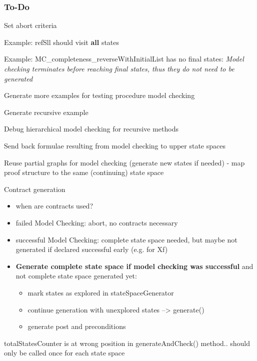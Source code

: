\documentclass[a4paper,12pt]{article}
\newcommand{\cmark}{\ding{51}}%
\newcommand{\xmark}{\ding{55}}%
\newcommand{\done}{\rlap{$\square$}{\raisebox{2pt}{\large\hspace{1pt}\cmark}}%
\hspace{-2.5pt}}
\newcommand{\wontfix}{\rlap{$\square$}{\large\hspace{1pt}\xmark}}
\begin{document}
\subsubsection{To-Do}
\begin{todolist}
	
	\item[\done] Set abort criteria	
	\item[\done] Example: refSll should visit \textbf{all} states
	\item[\done] Example: MC\_completeness\_reverseWithInitialList has no final states: \textit{Model checking terminates before reaching final states, thus they do not need to be generated}
	\item Generate more examples for testing procedure model checking 
	\item[\done] Generate recursive example
	\item Debug hierarchical model checking for recursive methods
	\item[\done] Send back formulae resulting from model checking to upper state spaces 
	\item Reuse partial graphs for model checking (generate new states if needed) - map proof structure to the same (continuing) state space
	\item Contract generation
	\begin{itemize}
		\item when are contracts used? 
		\item failed Model Checking: abort, no contracts necessary
		\item successful Model Checking: complete state space needed, but maybe not generated if declared successful early (e.g. for Xf)
		\item \textbf{ Generate complete state space if model checking was successful} and not complete state space generated yet: 
		\begin{itemize}
			\item mark states as explored in stateSpaceGenerator 
			\item continue generation with unexplored states --> generate() 
			\item generate post and preconditions
		\end{itemize} 
	\end{itemize}
	\item totalStatesCounter is at wrong position in generateAndCheck() method.. should only be called once for each state space

\end{todolist}
\end{document}
